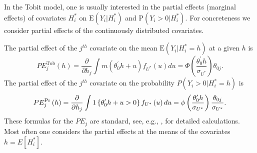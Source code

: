 \documentclass[12pt]{article}
\begin{document}
In the Tobit model, one is usually interested in the partial effects
(marginal effects) of covariates $H_{i}^{\ast }$ on $\mathrm{E}\left(
Y_{i}|H_{i}^{\ast }\right) $ and $\mathrm{P}\left( Y_{i}>0|H_{i}^{\ast
}\right) $. For concreteness we consider partial effects of the continuously
distributed covariates.

The partial effect of the $j^{th}$ covariate on the mean {}$\mathrm{E}\left( Y_{i}|H_{i}^{\ast }=h\right) $ at a
given $h$ is %
\begin{equation}
PE_{j}^{\text{Tob}}\left( h\right) =\frac{\partial }{\partial h_{j}}\int
m\left( \theta _{0}^{\prime }h+u\right) f_{U^{\ast }}\left( u\right) du=\Phi
\left( \frac{\theta _{0}^{\prime }h}{\sigma _{U^{\ast }}}\right) \theta
_{0j}.  \label{eq:PE_Tobit}
\end{equation}%
The partial effect of the $j^{th}$ covariate on the probability $P\left(
Y_{i}>0|H_{i}^{\ast }=h\right) $ is %
\begin{equation}
PE_{j}^{\Pr }\left( h\right) =\frac{\partial }{\partial h_{j}}\int 1\left\{
\theta _{0}^{\prime }h+u>0\right\} f_{U^{\ast }}\left( u\right) du=\phi
\left( \frac{\theta _{0}^{\prime }h}{\sigma _{U^{\ast }}}\right) \frac{%
\theta _{0j}}{\sigma _{U^{\ast }}}.  \label{eq:PE_Probit}
\end{equation}%
These formulas for the $PE_{j}$ are standard, see, e.g., \cite%
{Wooldridge2010Book}, for detailed calculations. Most often one considers
the partial effects at the means of the covariates $h=E\left[ H_{i}^{\ast }%
\right] $.
\end{document}

